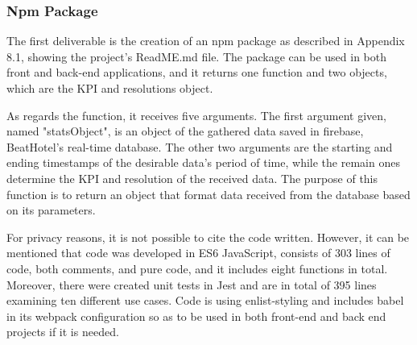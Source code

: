 \subsubsection{Npm Package}
The first deliverable is the creation of an npm package as described in Appendix 8.1, showing the project's ReadME.md file. The package can be used in both front and back-end applications, and it returns one function and two objects, which are the KPI and resolutions object. \par 
As regards the function, it receives five arguments. The first argument given, named "statsObject", is an object of the gathered data saved in firebase, BeatHotel's real-time database. The other two arguments are the starting and ending timestamps of the desirable data's period of time, while the remain ones determine the KPI and resolution of the received data. The purpose of this function is to return an object that format data received from the database based on its parameters. \par
For privacy reasons, it is not possible to cite the code written. However, it can be mentioned that code was developed in ES6 JavaScript, consists of 303 lines of code, both comments, and pure code, and it includes eight functions in total. Moreover, there were created unit tests in Jest and are in total of 395 lines examining ten different use cases. Code is using enlist-styling and includes babel in its webpack configuration so as to be used in both front-end and back end projects if it is needed. \par

